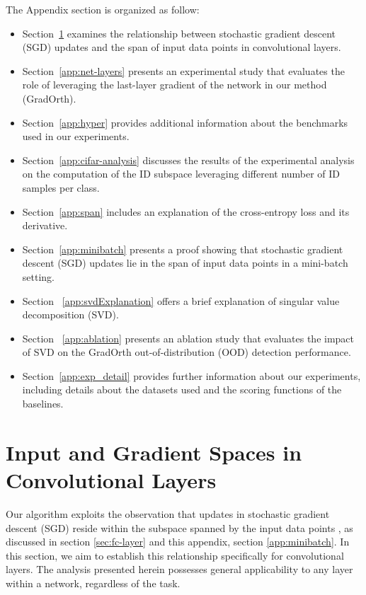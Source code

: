 \documentclass{article}
\begin{document}
The Appendix section is organized as follow:
\begin{itemize}
    \item Section~\ref{app:conv} examines the relationship between stochastic gradient descent (SGD) updates and the span of input data points in convolutional layers.
    \item Section~\ref{app:net-layers} presents an experimental study that evaluates the role of leveraging the last-layer gradient of the network in our method (GradOrth).
    \item Section~\ref{app:hyper} provides additional information about the benchmarks used in our experiments.
    \item Section~\ref{app:cifar-analysis} discusses the results of the experimental analysis on the computation of the ID subspace leveraging different number of ID samples per class.
    \item  Section~\ref{app:span} includes an explanation of the cross-entropy loss and its derivative.
    \item Section~\ref{app:minibatch} presents a proof showing that stochastic gradient descent (SGD) updates lie in the span of input data points in a mini-batch setting.
    \item Section~ \ref{app:svdExplanation} offers a brief explanation of singular value decomposition (SVD).
    \item Section~ \ref{app:ablation} presents an ablation study that evaluates the impact of SVD on the GradOrth out-of-distribution (OOD) detection performance.
    \item Section~\ref{app:exp_detail} provides further information about our experiments, including details about the datasets used and the scoring functions of the baselines.
\end{itemize}
\section{Input and Gradient Spaces in Convolutional Layers}
\label{app:conv}

Our algorithm exploits the observation that updates in stochastic gradient descent (SGD) reside within the subspace spanned by the input data points \citep{zhang2021understanding}, as discussed in section \ref{sec:fc-layer} and this appendix, section \ref{app:minibatch}. In this section, we aim to establish this relationship specifically for convolutional layers. The analysis presented herein possesses general applicability to any layer within a network, regardless of the task.
\end{document}
